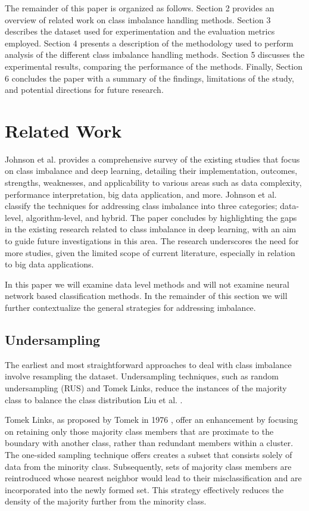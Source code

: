 \documentclass[journal]{IEEEtran}
\begin{document}
	The remainder of this paper is organized as follows. Section 2 provides an overview of related work on class imbalance handling methods. Section 3 describes the dataset used for experimentation and the evaluation metrics employed. Section 4 presents a description of the methodology used to perform analysis of the different class imbalance handling methods. Section 5 discusses the experimental results, comparing the performance of the methods. Finally, Section 6 concludes the paper with a summary of the findings, limitations of the study, and potential directions for future research.
	
	\section{Related Work}
	\label{sec:related_work}

	Johnson et al. \cite{johnson2019} provides a comprehensive survey of the existing studies that focus on class imbalance and deep learning, detailing their implementation, outcomes, strengths, weaknesses, and applicability to various areas such as data complexity, performance interpretation, big data application, and more. Johnson et al. classify the techniques for addressing class imbalance into three categories; data-level, algorithm-level, and hybrid.
	The paper concludes by highlighting the gaps in the existing research related to class imbalance in deep learning, with an aim to guide future investigations in this area. The research underscores the need for more studies, given the limited scope of current literature, especially in relation to big data applications.
	
	In this paper we will examine data level methods and will not examine neural network based classification methods. In the remainder of this section we will further contextualize the general strategies for addressing imbalance.
	
	\subsection{Undersampling}
	
	The earliest and most straightforward approaches to deal with class imbalance involve resampling the dataset. Undersampling techniques, such as random undersampling (RUS) and Tomek Links, reduce the instances of the majority class to balance the class distribution Liu et al. \cite{liu2009}. 

	Tomek Links, as proposed by Tomek in 1976 \cite{tomek1976}, offer an enhancement by focusing on retaining only those majority class members that are proximate to the boundary with another class, rather than redundant members within a cluster.
	The one-sided sampling technique \cite{kubat1997} offers creates a subset that consists solely of data from the minority class. Subsequently, sets of majority class members are reintroduced whose nearest neighbor would lead to their misclassification and are incorporated into the newly formed set. This strategy effectively reduces the density of the majority further from the minority class.
\end{document}
